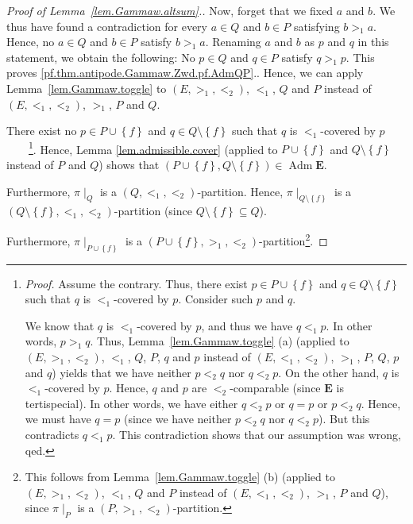 \documentclass[12pt]{article}
\theoremstyle{plain}
\theoremstyle{definition}
\theoremstyle{remark}
\newcommand{\Adm}{\operatorname{Adm}}
\newcommand{\EE}{{\mathbf{E}}}
\begin{document}
\begin{proof}[Proof of Lemma~\ref{lem.Gammaw.altsum}.]
{Now, forget that we fixed $a$ and $b$. We thus have found a
contradiction for every $a \in Q$ and $b \in P$ satisfying
$b >_1 a$. Hence, no $a \in Q$ and $b \in P$ satisfy $b >_1 a$.
Renaming $a$ and $b$ as $p$ and $q$ in this statement, we obtain
the following: No $p \in Q$ and $q \in P$ satisfy $q >_1 p$.
This proves \eqref{pf.thm.antipode.Gammaw.Zwd.pf.AdmQP}.}.
Hence, we can apply Lemma~\ref{lem.Gammaw.toggle} to
$\left(E, >_1, <_2\right)$, $<_1$, $Q$ and $P$ instead of
$\left(E, <_1, <_2\right)$, $>_1$, $P$ and $Q$.

There exist no $p\in P\cup\left\{  f\right\}  $ and $q\in
Q\setminus\left\{  f\right\}  $ such that $q$ is $<_{1}$-covered by
$p$\ \ \ \ \footnote{\textit{Proof.} Assume the contrary. Thus, there exist
$p\in P\cup\left\{  f\right\}  $ and $q\in Q\setminus\left\{  f\right\}  $
such that $q$ is $<_{1}$-covered by $p$. Consider such $p$ and $q$.
\par
We know that $q$ is $<_1$-covered by $p$, and thus we have
$q <_1 p$. In other words, $p >_1 q$. Thus,
Lemma~\ref{lem.Gammaw.toggle} (a) (applied to
$\left(E, >_1, <_2\right)$, $<_1$, $Q$, $P$, $q$ and $p$ instead of
$\left(E, <_1, <_2\right)$, $>_1$, $P$, $Q$, $p$ and $q$) yields
that we have neither $p <_2 q$ nor $q <_2 p$.
On the other hand,
$q$ is $<_{1}$-covered by $p$. Hence, $q$ and $p$ are
$<_{2}$-comparable (since $\EE$ is tertispecial).
In other words, we have either $q <_2 p$ or $q = p$ or $p <_2 q$.
Hence, we must have $q = p$ (since we have neither $p <_2 q$
nor $q <_2 p$). But this contradicts $q <_1 p$.
This contradiction shows that our
assumption was wrong, qed.}. Hence, Lemma \ref{lem.admissible.cover} (applied
to $P\cup\left\{  f\right\}  $ and $Q\setminus\left\{  f\right\}  $ instead of
$P$ and $Q$) shows that $\left(  P\cup\left\{  f\right\}  ,Q\setminus\left\{
f\right\}  \right)  \in \Adm \EE$.

Furthermore, $\pi\mid_{Q}$ is a $\left(  Q,<_{1},<_{2}\right)  $-partition.
Hence, $\pi\mid_{Q\setminus\left\{  f\right\}  }$ is a $\left(
Q\setminus\left\{  f\right\}  ,<_{1},<_{2}\right)  $-partition (since
$Q\setminus\left\{  f\right\}  \subseteq Q$).

Furthermore, $\pi\mid_{P\cup\left\{  f\right\}  }$ is a $\left(  P\cup\left\{
f\right\}  ,>_{1},<_{2}\right)  $-partition\footnote{This follows from
Lemma~\ref{lem.Gammaw.toggle} (b) (applied to
$\left(E, >_1, <_2\right)$, $<_1$, $Q$ and $P$ instead of
$\left(E, <_1, <_2\right)$, $>_1$, $P$ and $Q$), since $\pi\mid_P$ is a
$\left(P, >_1, <_2\right)$-partition.}.


\end{proof}
\end{document}
